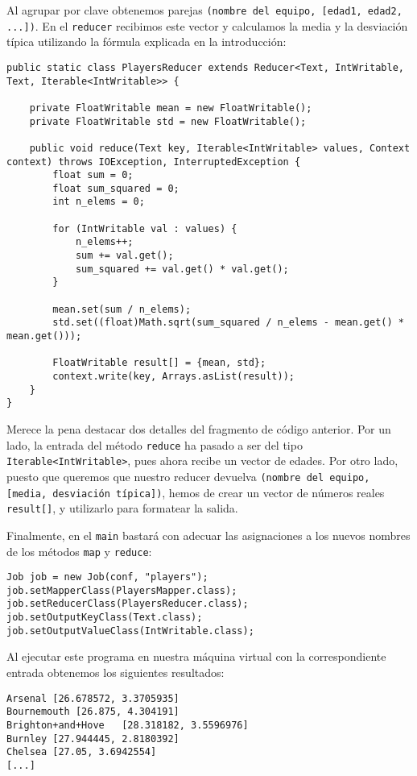 \documentclass[11pt]{article}
\def\inline{\lstinline[basicstyle=\ttfamily,keywordstyle={}]}
\begin{document}
Al agrupar por clave obtenemos parejas \inline{(nombre del equipo, [edad1, edad2, ...])}. En el \inline{reducer} recibimos este vector y calculamos la media y la desviación típica utilizando la fórmula explicada en la introducción:

\begin{verbatim}
public static class PlayersReducer extends Reducer<Text, IntWritable, Text, Iterable<IntWritable>> {
	
	private FloatWritable mean = new FloatWritable();
	private FloatWritable std = new FloatWritable();
	
	public void reduce(Text key, Iterable<IntWritable> values, Context context) throws IOException, InterruptedException {
		float sum = 0;
		float sum_squared = 0;
		int n_elems = 0;
		
		for (IntWritable val : values) {
			n_elems++;
			sum += val.get();
			sum_squared += val.get() * val.get();
		}
		
		mean.set(sum / n_elems);
		std.set((float)Math.sqrt(sum_squared / n_elems - mean.get() * mean.get()));
		
		FloatWritable result[] = {mean, std};
		context.write(key, Arrays.asList(result));
	}
}
\end{verbatim}

Merece la pena destacar dos detalles del fragmento de código anterior. Por un lado, la entrada del método \inline{reduce} ha pasado a ser del tipo \inline{Iterable<IntWritable>}, pues ahora recibe un vector de edades. Por otro lado, puesto que queremos que nuestro reducer devuelva \inline{(nombre del equipo, [media, desviación típica])}, hemos de crear un vector de números reales \inline{result[]}, y utilizarlo para formatear la salida.

Finalmente, en el \inline{main} bastará con adecuar las asignaciones a los nuevos nombres de los métodos \inline{map} y \inline{reduce}:

\begin{verbatim}
Job job = new Job(conf, "players");
job.setMapperClass(PlayersMapper.class);
job.setReducerClass(PlayersReducer.class);
job.setOutputKeyClass(Text.class);
job.setOutputValueClass(IntWritable.class);
\end{verbatim}

Al ejecutar este programa en nuestra máquina virtual con la correspondiente entrada obtenemos los siguientes resultados:

\begin{verbatim}
Arsenal	[26.678572, 3.3705935]
Bournemouth	[26.875, 4.304191]
Brighton+and+Hove	[28.318182, 3.5596976]
Burnley	[27.944445, 2.8180392]
Chelsea	[27.05, 3.6942554]
[...]
\end{verbatim}
\end{document}
